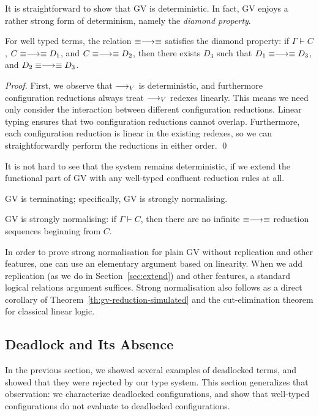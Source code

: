 \documentclass[oribibl,orivec,envcountsame]{llncs}
\begin{document}
It is straightforward to show that GV is deterministic. In fact, GV enjoys a rather strong form of
determinism, namely the \emph{diamond property}.
\begin{theorem}
For well typed terms, the relation $\equiv\longrightarrow\equiv$ satisfies the diamond property: if $\Gamma
\vdash C$, $C \equiv\longrightarrow\equiv D_1$, and $C \equiv\longrightarrow\equiv D_2$, then there exists $D_3$ such
that $D_1 \equiv\longrightarrow\equiv D_3$, and $D_2 \equiv\longrightarrow\equiv D_3$.
\end{theorem}
\begin{proof}
First, we observe that $\longrightarrow_V$ is deterministic, and furthermore configuration reductions always
treat $\longrightarrow_V$ redexes linearly. This means we need only consider the interaction between different
configuration reductions.
%
Linear typing ensures that two configuration reductions cannot overlap. Furthermore, each
configuration reduction is linear in the existing redexes, so we can straightforwardly perform the
reductions in either order. \qed
\end{proof}
%
It is not hard to see that the system remains deterministic, if we extend the functional part of GV
with any well-typed confluent reduction rules at all.

GV is terminating; specifically, GV is strongly normalising.
\begin{theorem}
GV is strongly normalising: if $\Gamma \vdash C$, then there are no infinite $\equiv\longrightarrow\equiv$
reduction sequences beginning from $C$.
\end{theorem}
In order to prove strong normalisation for plain GV without replication and other features, one can
use an elementary argument based on linearity. When we add replication (as we do in
Section~\ref{sec:extend}) and other features, a standard logical relations argument suffices. Strong
normalisation also follows as a direct corollary of Theorem~\ref{th:gv-reduction-simulated} and the
cut-elimination theorem for classical linear logic.

\subsection{Deadlock and Its Absence}\label{sec:gv-deadlock}
\newcommand{\blockedp}{\mathsf{blocked}}
\newcommand{\depp}{\mathsf{depends}}
\newcommand{\deadlockp}{\ensuremath{\mathsf{deadlocked}}}

In the previous section, we showed several examples of deadlocked terms, and showed that they were
rejected by our type system.  This section generalizes that observation: we characterize deadlocked
configurations, and show that well-typed configurations do not evaluate to deadlocked
configurations.
\end{document}
